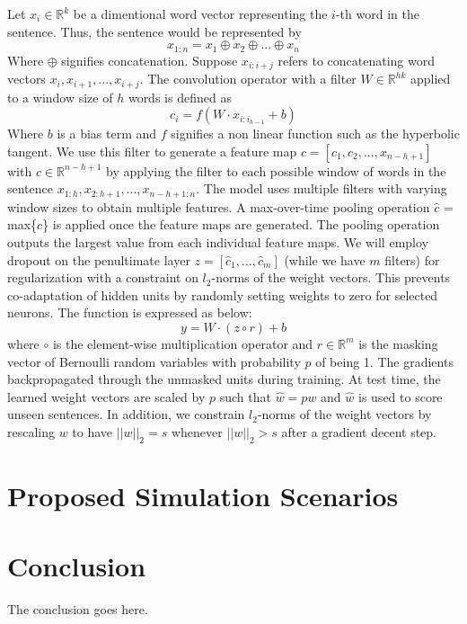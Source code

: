 \documentclass[conference]{IEEEtran}
\begin{document}
 Let $x_{i} \in \mathbb{R}^k$ be a dimentional word vector representing the $i$-th word in the 
 sentence. Thus, the sentence would be represented by 
 \begin{equation}
 x_{1:n} = x_1 \oplus x_2 \oplus ... \oplus x_n
 \end{equation}
 Where $\oplus$ signifies concatenation. Suppose $x_{i:i+j}$ refers to concatenating 
 word vectors $x_i, x_{i+1}, ... , x_{i+j}$. The convolution operator with a filter $W \in \mathbb{R}^{hk}$ applied to a window size of $h$ 
 words is defined as 
 \begin{equation}
 c_i = f(W \cdot x_{i:i_{h-1}} + b)
 \end{equation}
 Where $b$ is a bias term and $f$ signifies a non linear function such as the hyperbolic tangent. We use this
 filter to generate a feature map $c = [c_1, c_2, ... ,x_{n-h+1}]$ with $c \in \mathbb{R}^{n-h+1}$ by applying the filter to each possible window of words in the sentence $x_{1:h}, x_{2:h+1}, ... ,x_{n-h+1:n}$. 
 The model uses multiple filters with varying window sizes to obtain multiple features. 
 A max-over-time pooling operation $\hat{c}$ = max\{$c$\} is applied once the feature maps are generated. 
 The pooling operation outputs the largest value from each individual feature maps. 
 We will employ dropout on the penultimate layer $z = [\hat{c}_1,...,\hat{c}_m]$ (while we have $m$ filters) for regularization with a constraint on $l_2$-norms of the weight vectors. This prevents co-adaptation of hidden units by randomly setting weights to zero for selected neurons.  The function is expressed as below: 
 \begin{equation}
 y = W \cdot (z \circ r) + b
 \end{equation}
where $\circ$ is the element-wise multiplication operator and $r \in \mathbb{R}^m$ is the masking vector of Bernoulli random variables 
with probability $p$ of being 1. The gradients backpropagated through the unmasked units during training. At test time, the learned weight vectors are scaled by $p$ such that $\hat{w} = pw$ and $\hat{w}$ is used to score unseen sentences. 
In addition, we constrain $l_2$-norms of the weight vectors by rescaling $w$ to have $||w||_2 = s$ whenever $||w||_2 > s$ after a gradient decent step. 

 
\section{Proposed Simulation Scenarios}

\section{Conclusion}
The conclusion goes here.



\end{document}
